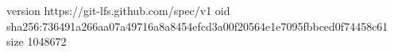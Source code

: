 version https://git-lfs.github.com/spec/v1
oid sha256:736491a266aa07a49716a8a8454efcd3a00f20564e1e7095fbbced0f74458c61
size 1048672
